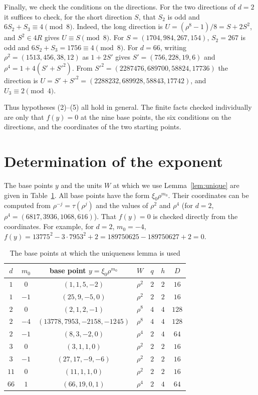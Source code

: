 \documentclass[a4paper,11pt]{article}
\theoremstyle{plain}
\theoremstyle{definition}
\theoremstyle{remark}
\numberwithin{equation}{section}
\numberwithin{table}{section}
\begin{document}
Finally, we check the conditions on the directions.
For the two directions of $d=2$ it suffices to check, for the short direction $S$, that $S_2$ is odd and $6S_2+S_3\equiv4\pmod8$.
Indeed, the long direction is $U=(\rho^8-1)/8=S+2S^2$, and $S^2\in4R$ gives $U\equiv S\pmod8$.
For $S=(1704,984,267,154)$, $S_2=267$ is odd and $6S_2+S_3=1756\equiv4\pmod8$.
For $d=66$, writing $\rho^2=(1513,456,38,12)$ as $1+2S'$ gives $S'=(756,228,19,6)$ and $\rho^4=1+4(S'+S'^2)$. From $S'^2=(2287476,689700,58824,17736)$ the direction is $U=S'+S'^2=(2288232,689928,58843,17742)$, and $U_3\equiv2\pmod4$.

Thus hypotheses (2)--(5) all hold in general.
The finite facts checked individually are only that $f(y)=0$ at the nine base points, the six conditions on the directions, and the coordinates of the two starting points.

\section{Determination of the exponent}\label{sec:exponents}

The base points $y$ and the units $W$ at which we use Lemma~\ref{lem:unique} are given in Table~\ref{tab:centres}.
All base points have the form $\xi_0\rho^{m_0}$. Their coordinates can be computed from $\rho^{-j}=\tau(\rho^j)$ and the values of $\rho^2$ and $\rho^4$ (for $d=2$, $\rho^4=(6817,3936,1068,616)$).
That $f(y)=0$ is checked directly from the coordinates. For example, for $d=2$, $m_0=-4$, $f(y)=13775^2-3\cdot7953^2+2=189750625-189750627+2=0$.

\begin{table}[htbp]
\centering
\caption{The base points at which the uniqueness lemma is used}\label{tab:centres}
\begin{tabular}{ccccccc}
\toprule
$d$ & $m_0$ & base point $y=\xi_0\rho^{m_0}$ & $W$ & $q$ & $h$ & $D$\\
\midrule
$1$ & $0$ & $(1,1,5,-2)$ & $\rho^2$ & $2$ & $2$ & $16$\\
$1$ & $-1$ & $(25,9,-5,0)$ & $\rho^2$ & $2$ & $2$ & $16$\\
$2$ & $0$ & $(2,1,2,-1)$ & $\rho^8$ & $4$ & $4$ & $128$\\
$2$ & $-4$ & $(13778,7953,-2158,-1245)$ & $\rho^8$ & $4$ & $4$ & $128$\\
$2$ & $-1$ & $(8,3,-2,0)$ & $\rho^4$ & $2$ & $4$ & $64$\\
$3$ & $0$ & $(3,1,1,0)$ & $\rho^2$ & $2$ & $2$ & $16$\\
$3$ & $-1$ & $(27,17,-9,-6)$ & $\rho^2$ & $2$ & $2$ & $16$\\
$11$ & $0$ & $(11,1,1,0)$ & $\rho^2$ & $2$ & $2$ & $16$\\
$66$ & $1$ & $(66,19,0,1)$ & $\rho^4$ & $2$ & $4$ & $64$\\
\bottomrule
\end{tabular}
\end{table}
\end{document}
